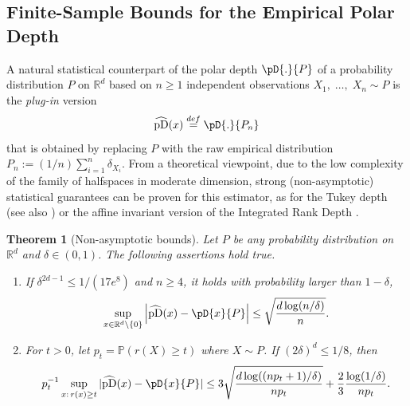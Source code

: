 \documentclass{article}
\numberwithin{equation}{section}
\newtheorem{theorem}{Theorem}[section]
\renewcommand{\P}{\mathbb{P}}
\newcommand{\rset}{\mathbb{R}}
\newcommand{\pDsymbol}{\mathrm{pD}}  %
\newcommand{\coD}[2]{\pD{#1}{#2}}
\begin{document}
\subsection{Finite-Sample Bounds for the Empirical Polar Depth}\label{subsec:bounds}
%
A natural statistical counterpart of the polar depth $\coD{.}{P}$ of
a probability distribution $P$ on $\rset^d$ based on $n\geq 1$ independent
observations $X_1,\; \ldots,\; X_n \sim P$ is the
\textit{plug-in} version 
\begin{equation}\label{eq:plugin}
\widehat{\pDsymbol}(x)\overset{def}{=}\coD{.}{P_n}
\end{equation}
that is obtained by replacing
$P$ with the raw empirical distribution
$P_n:=(1/n)\sum_{i=1}^n\delta_{X_i}$. From a theoretical viewpoint, due to
the low complexity of the family of halfspaces in moderate
dimension, strong (non-asymptotic) statistical guarantees can be
proven for this estimator, as for the Tukey depth \cite{BurrF17}
(see also \cite{nagyuniformrates}) or the affine invariant version of
the Integrated Rank Depth \cite{10.1214/23-EJS2189}.

\begin{theorem}[Non-asymptotic bounds]\label{thm:stat-coDepth}
    Let  $P$ be any probability distribution on $\rset^d$ and
    \(\delta\in(0,1)\). The following assertions hold true.
    \begin{enumerate}
        \item If \(\delta^{2d-1}\leq
            1/(17e^8)\) and \(n\geq 4\), it holds with probability
            larger than $1-\delta$,
            \begin{equation}
                \label{eq:deviations-coD-d}
                \sup_{x\in\rset^d\setminus\{0\}  } \left|\widehat{\pDsymbol}(x)
                - \coD{x}{P}\right|
                \le \sqrt{\frac{d\log(n/\delta)}{n}}.
            \end{equation}

        \item   For   $t>0$, let $p_t = \P(r(X)\ge t)$ where $X\sim
            P$. If \((2\delta)^{d}\leq 1/8\), then
            \begin{equation}\label{eq:normalizedDev_2}
                p_t^{-1} \sup_{x:\, r(x)\ge t   } |\widehat{\pDsymbol}(x) - \coD{x}{P}|
                \le 3\sqrt{\frac{d\log((np_t+1)/\delta)}{np_t}} +
                \frac{2}{3}\frac{\log(1/\delta)}{np_t}.
            \end{equation}
    \end{enumerate}
\end{theorem}
\end{document}
